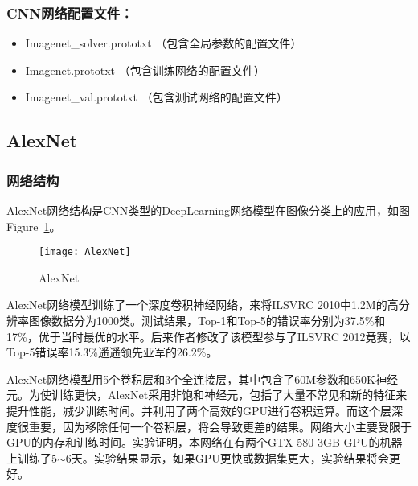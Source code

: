 \subsubsection{CNN网络配置文件：}
\begin{itemize}
\item Imagenet\_solver.prototxt （包含全局参数的配置文件）
\item Imagenet.prototxt （包含训练网络的配置文件）
\item Imagenet\_val.prototxt （包含测试网络的配置文件）
\end{itemize}



\subsection{AlexNet}
\subsubsection{网络结构}
AlexNet网络结构是CNN类型的DeepLearning网络模型在图像分类上的应用，如图Figure~\ref{fig:framework}。

\begin{figure}[!ht]
\centering
\texttt{[image: AlexNet]}
\caption{AlexNet}
\label{fig:framework}
\end{figure}

AlexNet网络模型训练了一个深度卷积神经网络，来将ILSVRC 2010中1.2M的高分辨率图像数据分为1000类。测试结果，Top-1和Top-5的错误率分别为37.5\%和17\%，优于当时最优的水平。后来作者修改了该模型参与了ILSVRC 2012竞赛，以Top-5错误率15.3\%遥遥领先亚军的26.2\%。

AlexNet网络模型用5个卷积层和3个全连接层，其中包含了60M参数和650K神经元。为使训练更快，AlexNet采用非饱和神经元，包括了大量不常见和新的特征来提升性能，减少训练时间。并利用了两个高效的GPU进行卷积运算。而这个层深度很重要，因为移除任何一个卷积层，将会导致更差的结果。网络大小主要受限于GPU的内存和训练时间。实验证明，本网络在有两个GTX 580 3GB GPU的机器上训练了5$\sim$6天。实验结果显示，如果GPU更快或数据集更大，实验结果将会更好。



